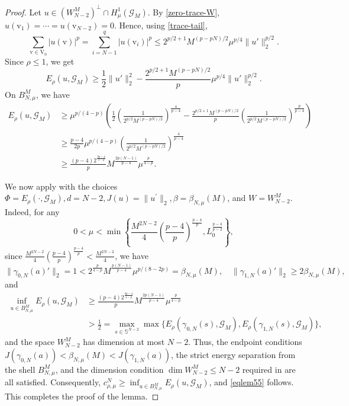 \documentclass[11pt]{amsart}
\newcommand{\norm}[1]{\lVert#1\rVert}
\newcommand{\G}{\mathcal{G}}
\newcommand{\V}{\mathrm{V}}
\newcommand{\vv}{\mathrm{v}}
\numberwithin{equation}{section}
\begin{document}
\begin{proof}
Let $u\in (W_{N-2}^M)^\perp\cap H^1_\mu(\G_M)$. By \eqref{zero-trace-W},  $u(\vv_1)=\cdots=u(\vv_{N-2})=0$. Hence, using \eqref{trace-tail},
$$
\sum_{\vv\in\V_0}|u(\vv)|^p=\sum_{i=N-1}^{q}|u(\vv_i)|^p\leq 2^{p/2+1}M^{(p-pN)/2}\mu^{p/4}\norm{u'}_2^{p/2}.
$$
Since $\rho\leq1$, we get
$$
E_\rho(u,\G_M)\geq\frac12\norm{u'}_2^2-\frac{2^{p/2+1}M^{(p-pN)/2}}{p}\mu^{p/4}\norm{u'}_2^{p/2}.
$$
On $B_{N,\mu}^M$, we have
$$
\begin{aligned}
    E_\rho(u,\G_M)&\geq\mu^{p/(4-p)}\left(\frac12\left(\frac{1}{2^{p/2}M^{(p-pN)/2}}\right)^{\frac{4}{p-4}}-\frac{2^{p/2+1}M^{(p-pN)/2}}{p}\left(\frac{1}{2^{p/2}M^{(p-pN)/2}}\right)^{\frac{p}{p-4}}\right)\\
&\geq \frac{p-4}{2p}\mu^{p/(4-p)}\left(\frac{1}{2^{p/2}M^{(p-pN)/2}}\right)^{\frac{4}{p-4}}\\
& \geq \frac{(p-4)2^{\frac{3p-4}{4-p}}}{p} M^{\frac{2p(N-1)}{p-4}}\mu^{\frac{p}{4-p}}.
\end{aligned}
$$

We now apply \cite[Theorem 2.10]{Ca} with the choices \(\Phi=E_{\rho}(\cdot,\mathcal{G}_M), d=N-2, J(u)=\|u^{\prime}\|_2, \beta=\beta_{N,\mu}(M)\), and \(W=W^M_{N-2}\). Indeed,
for any $$0<\mu<\min\left\{\frac{M^{2N-2}}{4}\left( \frac{p-4}{p} \right)^{\frac{p-4}{p}},L_0^\frac{p-4}{p-2}\right\},$$ 
since $\frac{M^{2N-2}}{4}\left( \frac{p-4}{p} \right)^{\frac{p-4}{p}}<\frac{M^{2N-2}}{4}$,  we have 
\[
\|\gamma_{0,N}(a)'\|_2=1<2^\frac{p}{4-p}M^\frac{p(N-1)}{p-4}\mu^{p/(8-2p)}= \beta_{N,\mu}(M), \quad \|\gamma_{1,N}(a)'\|_2\geq2\beta_{N,\mu}(M),
\]
and
$$
\begin{aligned}
\inf_{u\in B_{N,\mu}^M}E_\rho(u,\G_M)&\geq  \frac{(p-4)2^{\frac{3p-4}{4-p}}}{p} M^{\frac{2p(N-1)}{p-4}}\mu^{\frac{p}{4-p}}\\
&> \frac{1}{2}= \max_{s \in \mathbb{S}^{N-2}}\max\{E_\rho(\gamma_{0,N}(s),\G_M),E_\rho(\gamma_{1,N}(s),\G_M)\},
\end{aligned}
$$
and the space $W_{N-2}^M$ has dimension at most $N-2$. Thus, the endpoint conditions $J(\gamma_{0,N}(a))<\beta_{N,\mu}(M)<J(\gamma_{1,N}(a))$, the strict energy separation from the shell $B_{N,\mu}^M$, and the dimension condition $\dim W_{N-2}^M\leq N-2$ required in \cite[Theorem 2.10]{Ca} are all satisfied. Consequently, $c_{\rho,\mu}^N\geq\inf_{u\in B_{N,\mu}^M}E_\rho(u,\G_M)$, and \eqref{eqlem55} follows. This completes the proof of the lemma.
\end{proof}
\end{document}
